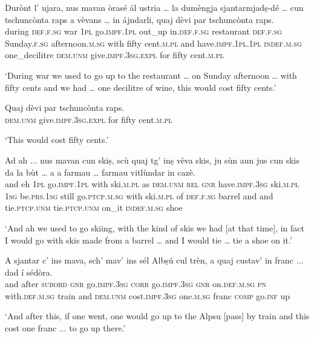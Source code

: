 \begin{linenumbers}
\gll  Durònt l’ ujara, nus mavan òrasé ál ustria … la dumèngja sjantarmjadṣ-dé … cun tschuncònta raps a vèvans … in ájndarli, quaj dèvi par tschuncònta raps.  \\
during \textsc{def.f.sg} war \textsc{1pl} go.\textsc{impf.1pl} out\_up in.\textsc{def.f.sg} restaurant {} \textsc{def.f.sg} Sunday.\textsc{f.sg} afternoon.\textsc{m.sg} {} with fifty cent.\textsc{m.pl} and have.\textsc{impf.1pl.1pl} {} \textsc{indef.m.sg} one\_decilitre \textsc{dem.unm} give.\textsc{impf.3sg.expl} for fifty cent.\textsc{m.pl} \\
\end{linenumbers}
\medskip
\glt `During war we used to go up to the restaurant … on Sunday afternoon … with fifty cents and we had … one decilitre of wine, this would cost fifty cents.'
\medskip

\begin{linenumbers}
\gll    Quaj dèvi par tschuncònta raps.\\
\textsc{dem.unm} give.\textsc{impf.3sg.expl} for fifty cent.\textsc{m.pl} \\
\end{linenumbers}
\medskip
\glt `This would cost fifty cents.'
\medskip

\begin{linenumbers}
\gll    Ad ah ... nus mavan cun skiṣ, scù quaj tg’ inṣ vèva skis, ju sùn aun jus cun skis da la bùt … a a farmau … farmau vitlùndar in cazè.\\ 
and eh {} \textsc{1pl} go.\textsc{impf.1pl} with ski.\textsc{m.pl} as \textsc{dem.unm} \textsc{rel} \textsc{gnr} have.\textsc{impf.3sg} ski.\textsc{m.pl} \textsc{1sg} be.\textsc{prs.1sg} still go.\textsc{ptcp.m.sg}  with ski.\textsc{m.pl} of \textsc{def.f.sg} barrel {} and and tie.\textsc{ptcp.unm} {} tie.\textsc{ptcp.unm} on\_it \textsc{indef.m.sg} shoe\\
\end{linenumbers} 
\medskip
\glt `And ah we used to go skiing, with the kind of skis we had [at that time], in fact I would go with skis made from a barrel … and I would tie … tie a shoe on it.'
\medskip

\begin{linenumbers}
\gll    A sjantar c’ ins mava, sch’ mav’ ins sél Albṣú cul trèn, a quaj custav’ in franc ... dad í sédòra.\\
and after \textsc{subord} \textsc{gnr}  go.\textsc{impf.3sg} \textsc{corr} go.\textsc{impf.3sg} \textsc{gnr} on.\textsc{def.m.sg} \textsc{pn} with.\textsc{def.m.sg} train and \textsc{dem.unm} cost.\textsc{impf.3sg} one.\textsc{m.sg}  franc {} \textsc{comp} go.\textsc{inf} up\\
\end{linenumbers}
\medskip
\glt `And after this, if one went, one would go up to the Alpsu [pass] by train and this cost one franc ... to go up there.'
\medskip

